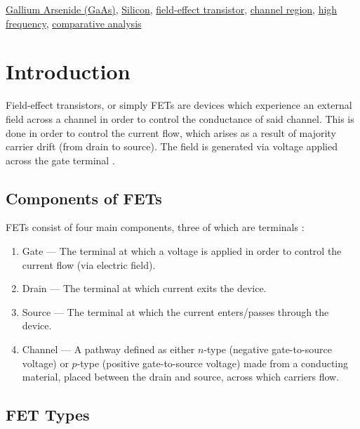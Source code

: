 \documentclass[conference]{IEEEtran}
\begin{document}
\begin{IEEEkeywords}
  \underline{Gallium Arsenide (GaAs)}, \underline{Silicon}, \underline{field-effect transistor}, \underline{channel region}, \underline{high frequency}, \underline{comparative analysis}
\end{IEEEkeywords}

\section{Introduction}

Field-effect transistors, or simply FETs are devices which experience an external field across a channel in order to control the conductance of said channel. This is done in order to control the current flow, which arises as a result of majority carrier drift (from drain to source). The field is generated via voltage applied across the gate terminal \cite[Page 643, \textit{Defining Terms}]{textbook}.

\subsection{Components of FETs}

FETs consist of four main components, three of which are terminals \cite{wiki}:

\begin{enumerate}

  \item Gate — The terminal at which a voltage is applied in order to control the current flow (via electric field).

  \item Drain — The terminal at which current exits the device.

  \item Source — The terminal at which the current enters/passes through the device.

  \item Channel — A pathway defined as either $n$-type (negative gate-to-source voltage) or $p$-type (positive gate-to-source voltage) made from a conducting material, placed between the drain and source, across which carriers flow.

\end{enumerate}

\subsection{FET Types}
\end{document}
